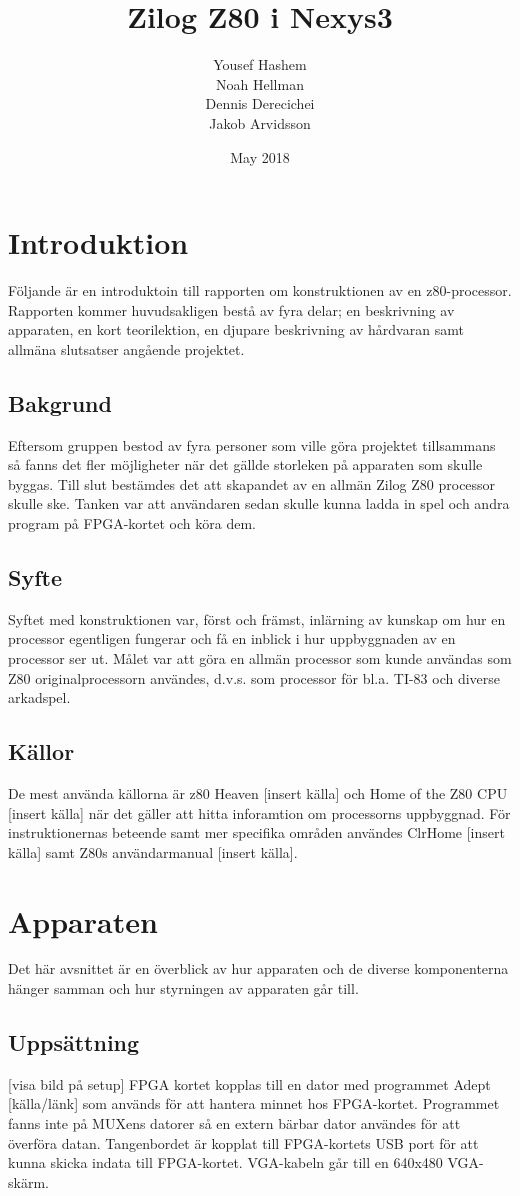 \documentclass{article}
\title{\Huge Zilog Z80 i Nexys3}
\author{\LARGE Yousef Hashem\\
        \LARGE Noah Hellman\\
        \LARGE Dennis Derecichei\\ 
        \LARGE Jakob Arvidsson}
\date{\Large May 2018}
\begin{document}
\maketitle

\clearpage
\section{Introduktion}
Följande är en introduktoin till rapporten om konstruktionen av en z80-processor. Rapporten kommer huvudsakligen bestå av fyra delar; en beskrivning av apparaten, en kort teorilektion, en djupare beskrivning av hårdvaran samt allmäna slutsatser angående projektet.
\subsection{Bakgrund}
Eftersom gruppen bestod av fyra personer som ville göra projektet tillsammans så fanns det fler möjligheter när det gällde storleken på apparaten som skulle byggas. Till slut bestämdes det att skapandet av en allmän Zilog Z80 processor skulle ske. Tanken var att användaren sedan skulle kunna ladda in spel och andra program på FPGA-kortet och köra dem.
\subsection{Syfte}
Syftet med konstruktionen var, först och främst, inlärning av kunskap om hur en processor egentligen fungerar och få en inblick i hur uppbyggnaden av en processor ser ut. Målet var att göra en allmän processor som kunde användas som Z80 originalprocessorn användes, d.v.s. som processor för bl.a. TI-83 och diverse arkadspel.
\subsection{Källor}
De mest använda källorna är z80 Heaven [insert källa] och Home of the Z80 CPU [insert källa] när det gäller att hitta inforamtion om processorns uppbyggnad. För instruktionernas beteende samt mer specifika områden användes ClrHome [insert källa] samt Z80s användarmanual [insert källa].

\clearpage
\section{Apparaten}
Det här avsnittet är en överblick av hur apparaten och de diverse komponenterna hänger samman och hur styrningen av apparaten går till.
\subsection{Uppsättning}
[visa bild på setup] FPGA kortet kopplas till en dator med programmet Adept [källa/länk] som används för att hantera minnet hos FPGA-kortet. Programmet fanns inte på MUXens datorer så en extern bärbar dator användes för att överföra datan. Tangenbordet är kopplat till FPGA-kortets USB port för att kunna skicka indata till FPGA-kortet. VGA-kabeln går till en 640x480 VGA-skärm.
\end{document}
